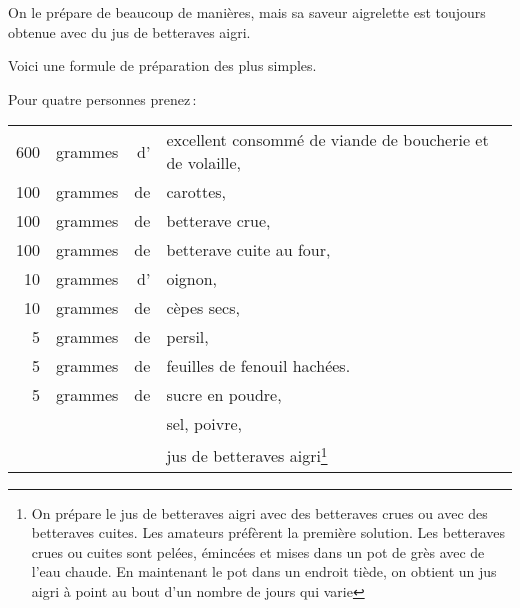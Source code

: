 On le prépare de beaucoup de manières, mais sa saveur aigrelette est toujours
obtenue avec du jus de betteraves aigri. 

Voici une formule de préparation des plus simples.

\medskip

Pour quatre personnes prenez :

\medskip

\footnotesize
\begin{longtable}{rrrp{16em}}                                                      
   600 & grammes  & d' & excellent consommé de viande de boucherie et de volaille,                        \\
   100 & grammes  & de & carottes,                                                                        \\
   100 & grammes  & de & betterave crue,                                                                  \\
   100 & grammes  & de & betterave cuite au four,                                                         \\
    10 & grammes  & d' & oignon,                                                                          \\
    10 & grammes  & de & cèpes secs,                                                                      \\
     5 & grammes  & de & persil,                                                                          \\
     5 & grammes  & de & feuilles de fenouil hachées.                                                     \\
     5 & grammes  & de & sucre en poudre,                                                                 \\
       &          &    & sel, poivre,                                                                     \\
       &          &    & jus de betteraves aigri\footnote{On prépare le jus de betteraves                   
                         aigri avec des betteraves crues ou avec des betteraves cuites.                    
                         Les amateurs préfèrent la première solution. Les betteraves crues                 
                         ou cuites sont pelées, émincées et mises dans un pot de grès avec                 
                         de l’eau chaude. En maintenant le pot dans un endroit tiède, on                   
                         obtient un jus aigri à point au bout d'un nombre de jours qui varie               
}
\end{longtable}
